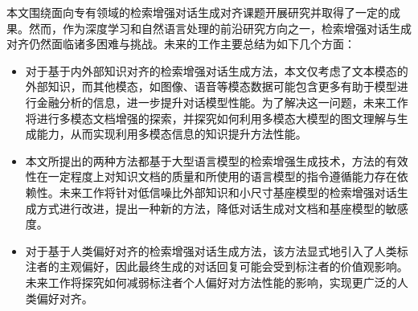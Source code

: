 本文围绕面向专有领域的检索增强对话生成对齐课题开展研究并取得了一定的成果。然而，作为深度学习和自然语言处理的前沿研究方向之一，检索增强对话生成对齐仍然面临诸多困难与挑战。未来的工作主要总结为如下几个方面：

\begin{itemize}[topsep = 0 pt, itemsep= 0 pt, parsep=0pt, partopsep=0pt, leftmargin=20pt, itemindent=0pt, labelsep=6pt, listparindent=24pt]
	\item 对于基于内外部知识对齐的检索增强对话生成方法，本文仅考虑了文本模态的外部知识，而其他模态，如图像、语音等模态数据可能包含更多有助于模型进行金融分析的信息，进一步提升对话模型性能。为了解决这一问题，未来工作将进行多模态文档增强的探索，并探究如何利用多模态大模型的图文理解与生成能力，从而实现利用多模态信息的知识提升方法性能。
    
    
    \item 本文所提出的两种方法都基于大型语言模型的检索增强生成技术，方法的有效性在一定程度上对知识文档的质量和所使用的语言模型的指令遵循能力存在依赖性。未来工作将针对低信噪比外部知识和小尺寸基座模型的检索增强对话生成方式进行改进，提出一种新的方法，降低对话生成对文档和基座模型的敏感度。
    
    \item 对于基于人类偏好对齐的检索增强对话生成方法，该方法显式地引入了人类标注者的主观偏好，因此最终生成的对话回复可能会受到标注者的价值观影响。未来工作将探究如何减弱标注者个人偏好对方法性能的影响，实现更广泛的人类偏好对齐。
\end{itemize}